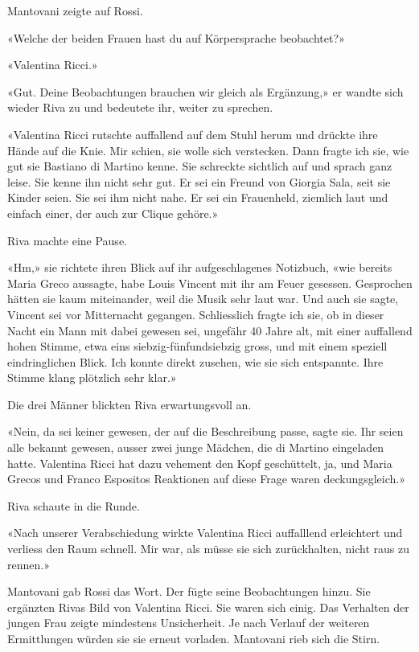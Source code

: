 Mantovani zeigte auf Rossi.

«Welche der beiden Frauen hast du auf Körpersprache beobachtet?»

«Valentina Ricci.»

«Gut. Deine Beobachtungen brauchen wir gleich als Ergänzung,» er wandte
sich wieder Riva zu und bedeutete ihr, weiter zu sprechen.

«Valentina Ricci rutschte auffallend auf dem Stuhl herum und drückte ihre 
Hände auf die Knie. Mir schien, sie wolle sich verstecken. Dann fragte
ich sie, wie gut sie Bastiano di Martino kenne. Sie schreckte sichtlich auf 
und sprach ganz leise. Sie kenne ihn nicht sehr gut. Er sei ein Freund
von Giorgia Sala, seit sie Kinder seien. Sie sei ihm nicht nahe. Er sei
ein Frauenheld, ziemlich laut und einfach einer, der auch zur Clique
gehöre.»

Riva machte eine Pause.

«Hm,» sie richtete ihren Blick auf ihr aufgeschlagenes Notizbuch, «wie
bereits Maria Greco aussagte, habe Louis Vincent mit ihr am Feuer
gesessen. Gesprochen hätten sie kaum miteinander, weil die Musik sehr
laut war. Und auch sie sagte, Vincent sei vor Mitternacht gegangen.
Schliesslich fragte ich sie, ob in dieser Nacht ein Mann mit dabei
gewesen sei, ungefähr 40 Jahre alt, mit einer auffallend hohen Stimme,
etwa eins siebzig-fünfundsiebzig gross, und mit einem speziell
eindringlichen Blick. Ich konnte direkt zusehen, wie sie sich
entspannte. Ihre Stimme klang plötzlich sehr klar.»

Die drei Männer blickten Riva erwartungsvoll an.

«Nein, da sei keiner gewesen, der auf die Beschreibung passe, sagte sie.
Ihr seien alle bekannt gewesen, ausser zwei junge Mädchen, die di
Martino eingeladen hatte. Valentina Ricci hat dazu vehement den Kopf
geschüttelt, ja, und Maria Grecos und Franco Espositos Reaktionen auf
diese Frage waren deckungsgleich.»

Riva schaute in die Runde.

«Nach unserer Verabschiedung wirkte Valentina Ricci auffalllend 
erleichtert und verliess den Raum schnell. Mir war, als müsse sie sich
zurückhalten, nicht raus zu rennen.»

Mantovani gab Rossi das Wort. Der fügte seine Beobachtungen
hinzu. Sie ergänzten Rivas Bild von Valentina Ricci. Sie waren sich
einig. Das Verhalten der jungen Frau zeigte mindestens Unsicherheit. Je
nach Verlauf der weiteren Ermittlungen würden sie sie erneut vorladen.
Mantovani rieb sich die Stirn. 


